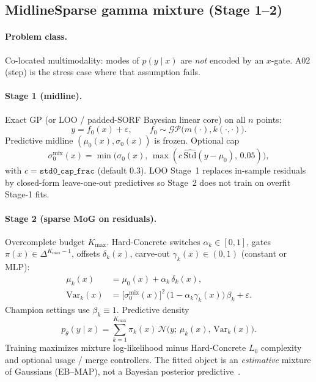 \documentclass[11pt,a4paper]{article}
\theoremstyle{definition}
\newcommand{\Ncal}{\mathcal{N}}
\newcommand{\GP}{\mathcal{GP}}
\newcommand{\Kmax}{K_{\max}}
\begin{document}
\subsection{MidlineSparse gamma mixture (Stage 1--2)}
\label{sec:gamma}

\paragraph{Problem class.}
Co-located multimodality: modes of $p(y\mid x)$ are \emph{not} encoded by an
$x$-gate. A02 (step) is the stress case where that assumption fails.

\paragraph{Stage 1 (midline).}
Exact GP (or LOO / padded-SORF Bayesian linear core) on all $n$ points:
\begin{equation}
  y = f_0(x)+\varepsilon,\qquad
  f_0\sim\GP\bigl(m(\cdot),k(\cdot,\cdot)\bigr).
\end{equation}
Predictive midline $(\mu_0(x),\sigma_0(x))$ is frozen. Optional cap
\begin{equation}
  \sigma_0^{\mathrm{mix}}(x)
  =
  \min\bigl(\sigma_0(x),\,\max(c\,\widehat{\mathrm{Std}}(y-\mu_0),\,0.05)\bigr),
\end{equation}
with $c=\texttt{std0\_cap\_frac}$ (default $0.3$). LOO Stage~1 replaces
in-sample residuals by closed-form leave-one-out predictives so Stage~2 does
not train on overfit Stage-1 fits.

\paragraph{Stage 2 (sparse MoG on residuals).}
Overcomplete budget $\Kmax$. Hard-Concrete switches $\alpha_k\in[0,1]$,
gates $\pi(x)\in\Delta^{\Kmax-1}$, offsets $\delta_k(x)$, carve-out
$\gamma_k(x)\in(0,1)$ (constant or MLP):
\begin{align}
  \mu_k(x)
  &=
  \mu_0(x)+\alpha_k\,\delta_k(x),
  \\
  \mathrm{Var}_k(x)
  &=
  \bigl[\sigma_0^{\mathrm{mix}}(x)\bigr]^2\,
  \bigl(1-\alpha_k\gamma_k(x)\bigr)\,\beta_k
  +\varepsilon.
\end{align}
Champion settings use $\beta_k\equiv 1$. Predictive density
\begin{equation}
  p_\theta(y\mid x)
  =
  \sum_{k=1}^{\Kmax}
  \pi_k(x)\,
  \Ncal\!\bigl(y;\,\mu_k(x),\,\mathrm{Var}_k(x)\bigr).
\end{equation}
Training maximizes mixture log-likelihood minus Hard-Concrete $L_0$ complexity
and optional usage / merge controllers. The fitted object is an
\emph{estimative} mixture of Gaussians (EB--MAP), not a Bayesian posterior
predictive~\cite{foundations-note}.
\end{document}

